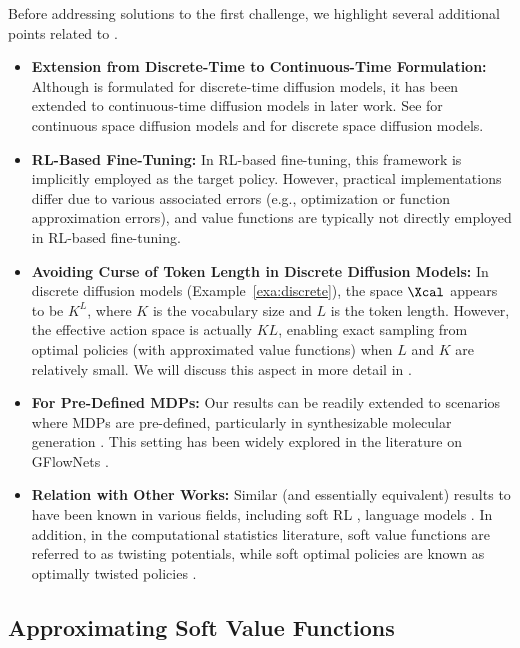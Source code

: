 Before addressing solutions to the first challenge, we highlight several additional points related to . 
\begin{itemize} 
 \item \textbf{Extension from Discrete-Time to Continuous-Time Formulation:} Although  is formulated for discrete-time diffusion models, it has been extended to continuous-time diffusion models in later work. See \citet[Theorem 1]{uehara2024finetuning} for continuous space diffusion models and \citet[Theorem 1]{wang2024finetuning} for discrete space diffusion models.
\item \textbf{RL-Based Fine-Tuning:} In RL-based fine-tuning, this framework is implicitly employed as the target policy. However, practical implementations differ due to various associated errors (e.g., optimization or function approximation errors), and value functions are typically not directly employed in RL-based fine-tuning.
\item \textbf{Avoiding Curse of Token Length in Discrete Diffusion Models:} In discrete diffusion models (Example~\ref{exa:discrete}), the space $\Xcal$ appears to be $K^L$, where $K$ is the vocabulary size and $L$ is the token length. However, the effective action space is actually $KL$, enabling exact sampling from optimal policies (with approximated value functions) when $L$ and $K$ are relatively small. We will discuss this aspect in more detail in . 
\item \textbf{For Pre-Defined MDPs:} Our results can be readily extended to scenarios where MDPs are pre-defined, particularly in synthesizable molecular generation \citep{cretu2024synflownet,seo2024generative}. This setting has been widely explored in the literature on GFlowNets \citep{bengio2023gflownet}.
\item \textbf{Relation with Other Works:} Similar (and essentially equivalent) results to  have been known in various fields, including soft RL \citep{haarnoja2017reinforcement,levine2018reinforcement}, language models \citep{mudgal2023controlled,han2024value}. In addition, in the computational statistics literature, soft value functions are referred to as twisting potentials, while soft optimal policies are known as optimally twisted policies \citep{doucet2009tutorial,naesseth2019elements,heng2020controlled}.  
\end{itemize}

\subsection{Approximating Soft Value Functions}\label{sec:method_value}


